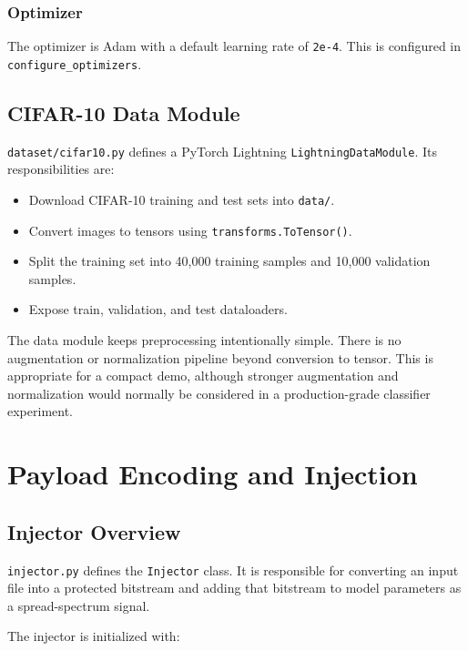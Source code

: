 \documentclass[11pt,a4paper]{article}
\newcommand{\code}[1]{\texttt{#1}}
\begin{document}
\subsubsection{Optimizer}

The optimizer is Adam with a default learning rate of \code{2e-4}. This is configured in \code{configure\_optimizers}.

\subsection{CIFAR-10 Data Module}

\code{dataset/cifar10.py} defines a PyTorch Lightning \code{LightningDataModule}. Its responsibilities are:

\begin{itemize}[leftmargin=1.4em]
  \item Download CIFAR-10 training and test sets into \code{data/}.
  \item Convert images to tensors using \code{transforms.ToTensor()}.
  \item Split the training set into 40,000 training samples and 10,000 validation samples.
  \item Expose train, validation, and test dataloaders.
\end{itemize}

The data module keeps preprocessing intentionally simple. There is no augmentation or normalization pipeline beyond conversion to tensor. This is appropriate for a compact demo, although stronger augmentation and normalization would normally be considered in a production-grade classifier experiment.

\section{Payload Encoding and Injection}

\subsection{Injector Overview}

\code{injector.py} defines the \code{Injector} class. It is responsible for converting an input file into a protected bitstream and adding that bitstream to model parameters as a spread-spectrum signal.

The injector is initialized with:
\end{document}
